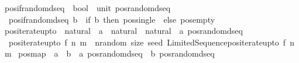 \begin{isabellebody}
\isanewline
{}\isamarkupfalse%
\ pos{\isacharunderscore}{\kern0pt}if{\isacharunderscore}{\kern0pt}random{\isacharunderscore}{\kern0pt}dseq\ {\isacharcolon}{\kern0pt}{\isacharcolon}{\kern0pt}\ {\isachardoublequoteopen}bool\ {\isacharequal}{\kern0pt}{\isachargreater}{\kern0pt}\ unit\ pos{\isacharunderscore}{\kern0pt}random{\isacharunderscore}{\kern0pt}dseq{\isachardoublequoteclose}\isanewline
{}\isanewline
\ \ {\isachardoublequoteopen}pos{\isacharunderscore}{\kern0pt}if{\isacharunderscore}{\kern0pt}random{\isacharunderscore}{\kern0pt}dseq\ b\ {\isacharequal}{\kern0pt}\ {\isacharparenleft}{\kern0pt}if\ b\ then\ pos{\isacharunderscore}{\kern0pt}single\ {\isacharparenleft}{\kern0pt}{\isacharparenright}{\kern0pt}\ else\ pos{\isacharunderscore}{\kern0pt}empty{\isacharparenright}{\kern0pt}{\isachardoublequoteclose}\isanewline
\isanewline
{}\isamarkupfalse%
\ pos{\isacharunderscore}{\kern0pt}iterate{\isacharunderscore}{\kern0pt}upto\ {\isacharcolon}{\kern0pt}{\isacharcolon}{\kern0pt}\ {\isachardoublequoteopen}{\isacharparenleft}{\kern0pt}natural\ {\isacharequal}{\kern0pt}{\isachargreater}{\kern0pt}\ {\isacharprime}{\kern0pt}a{\isacharparenright}{\kern0pt}\ {\isacharequal}{\kern0pt}{\isachargreater}{\kern0pt}\ natural\ {\isacharequal}{\kern0pt}{\isachargreater}{\kern0pt}\ natural\ {\isacharequal}{\kern0pt}{\isachargreater}{\kern0pt}\ {\isacharprime}{\kern0pt}a\ pos{\isacharunderscore}{\kern0pt}random{\isacharunderscore}{\kern0pt}dseq{\isachardoublequoteclose}\isanewline
{}\isanewline
\ \ {\isachardoublequoteopen}pos{\isacharunderscore}{\kern0pt}iterate{\isacharunderscore}{\kern0pt}upto\ f\ n\ m\ {\isacharequal}{\kern0pt}\ {\isacharparenleft}{\kern0pt}{\isasymlambda}nrandom\ size\ seed{\isachardot}{\kern0pt}\ Limited{\isacharunderscore}{\kern0pt}Sequence{\isachardot}{\kern0pt}pos{\isacharunderscore}{\kern0pt}iterate{\isacharunderscore}{\kern0pt}upto\ f\ n\ m{\isacharparenright}{\kern0pt}{\isachardoublequoteclose}\isanewline
\isanewline
{}\isamarkupfalse%
\ pos{\isacharunderscore}{\kern0pt}map\ {\isacharcolon}{\kern0pt}{\isacharcolon}{\kern0pt}\ {\isachardoublequoteopen}{\isacharparenleft}{\kern0pt}{\isacharprime}{\kern0pt}a\ {\isacharequal}{\kern0pt}{\isachargreater}{\kern0pt}\ {\isacharprime}{\kern0pt}b{\isacharparenright}{\kern0pt}\ {\isacharequal}{\kern0pt}{\isachargreater}{\kern0pt}\ {\isacharprime}{\kern0pt}a\ pos{\isacharunderscore}{\kern0pt}random{\isacharunderscore}{\kern0pt}dseq\ {\isacharequal}{\kern0pt}{\isachargreater}{\kern0pt}\ {\isacharprime}{\kern0pt}b\ pos{\isacharunderscore}{\kern0pt}random{\isacharunderscore}{\kern0pt}dseq{\isachardoublequoteclose}\isanewline

\end{isabellebody}
